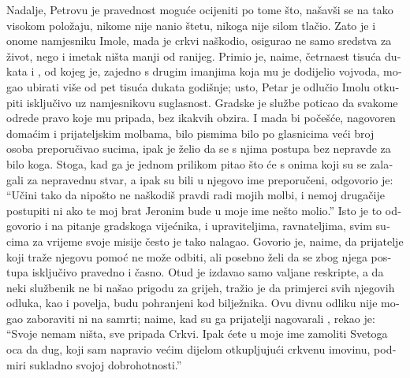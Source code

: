 \documentclass[a5paper,twoside]{article}
\begin{document}
\begin{pages}
\begin{Rightside}
\begin{croatian}
\pend
\pstart
Nadalje, Petrovu je pravednost moguće ocijeniti po tome što, našavši se na tako visokom položaju, nikome nije nanio štetu, nikoga nije silom tlačio.  Zato je i onome namjesniku Imole, mada je crkvi naškodio, osigurao ne samo sredstva za život, nego i imetak ništa manji od ranijeg.  Primio je, naime, četrnaest tisuća dukata i , od kojeg je, zajedno s drugim imanjima koja mu je dodijelio vojvoda, mogao ubirati više od pet tisuća dukata godišnje; usto, Petar je odlučio Imolu otkupiti isključivo uz namjesnikovu suglasnost.  Gradske je službe poticao da svakome odrede pravo koje mu pripada, bez ikakvih obzira.  I mada bi počešće, nagovoren domaćim i prijateljskim molbama, bilo pismima bilo po glasnicima veći broj osoba preporučivao sucima, ipak je želio da se s njima postupa bez nepravde za bilo koga.  Stoga, kad ga je  jednom prilikom pitao što će s onima koji su se zalagali za nepravednu stvar, a ipak su bili u njegovo ime preporučeni, odgovorio je: ``Učini tako da nipošto ne naškodiš pravdi radi mojih molbi, i nemoj drugačije postupiti ni ako te moj brat Jeronim bude u moje ime nešto molio.''  Isto je to odgovorio i na pitanje gradskoga vijećnika, i upraviteljima, ravnateljima, svim sucima za vrijeme svoje misije često je tako nalagao.  Govorio je, naime, da prijatelje koji traže njegovu pomoć ne može odbiti, ali posebno želi da se zbog njega postupa isključivo pravedno i časno.  Otud je izdavao samo valjane reskripte, a da neki službenik ne bi našao prigodu za grijeh, tražio je da primjerci svih njegovih odluka, kao i povelja, budu pohranjeni kod bilježnika.  Ovu divnu odliku nije mogao zaboraviti ni na samrti; naime, kad su ga prijatelji nagovarali , rekao je: ``Svoje nemam ništa, sve pripada Crkvi.  Ipak ćete u moje ime zamoliti Svetoga oca da dug, koji sam napravio većim dijelom otkupljujući crkvenu imovinu, podmiri sukladno svojoj dobrohotnosti.''


\end{croatian}
\end{Rightside}
\end{pages}
\end{document}

